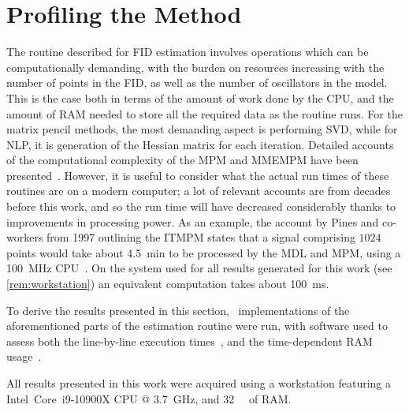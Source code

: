 \section{Profiling the Method}
\label{sec:profiling}
The routine described for \ac{FID} estimation involves operations which can be
computationally demanding, with the burden on resources
increasing with the number of points in the \ac{FID}, as well as the number of
oscillators in the model. This is the case both in terms of the amount of work
done by the \ac{CPU}, and the amount of \ac{RAM} needed to store all the
required data as the routine runs. For the matrix pencil methods, the most
demanding aspect is performing \ac{SVD}, while for \ac{NLP}, it
is generation of the Hessian matrix for each iteration. Detailed accounts of the
computational complexity of the \ac{MPM} and \ac{MMEMPM} have been
presented~\cite{Hua1992,Chen2007}.  However, it is useful to consider what the
actual run times of these routines are on a modern computer; a lot of relevant
accounts are from decades before this work, and so the
run time will have decreased considerably thanks to
improvements in processing power. As an example, the account by Pines and
co-workers from 1997 outlining the \ac{ITMPM} states that a signal comprising
$1024$ points would take about
\qty{4.5}{\minute} to be processed by the \ac{MDL} and \ac{MPM}, using a
\qty{100}{\mega\hertz} \ac{CPU}~\cite{Lin1997}. On the system used for all
results generated for this work (see \cref{rem:workstation}) an
equivalent computation takes about \qty{100}{\milli\second}.

To derive the results presented in this section, \Python\ implementations of
the aforementioned parts of the estimation routine were run, with software used
to assess both the line-by-line execution times~\cite{LineProf}, and the
time-dependent \ac{RAM} usage~\cite{MemProf}.
\begin{remark}
    \label{rem:workstation}
    All results presented in this work were acquired using a workstation
    featuring a Intel\textregistered\ Core\texttrademark\ i9-10900X \ac{CPU} @
    \qty{3.7}{\giga\hertz}, and \qty{32}{\gibi\byte} of \ac{RAM}.
\end{remark}

